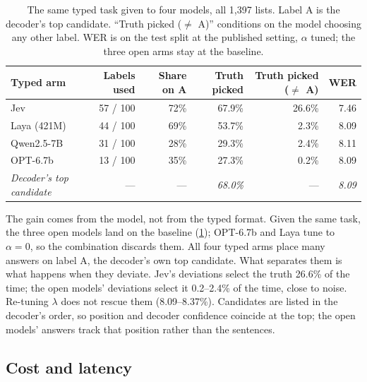 \documentclass[11pt]{article}
\begin{document}
\begin{table}[t]
\centering\small
\begin{tabular}{lrrrrr}
\toprule
Typed arm & Labels used & Share on A & Truth picked & Truth picked ($\neq$ A) & WER \\
\midrule
Jev & 57 / 100 & 72\% & 67.9\% & 26.6\% & 7.46 \\
Laya (421M) & 44 / 100 & 69\% & 53.7\% & 2.3\% & 8.09 \\
Qwen2.5-7B & 31 / 100 & 28\% & 29.3\% & 2.4\% & 8.11 \\
OPT-6.7b & 13 / 100 & 35\% & 27.3\% & 0.2\% & 8.09 \\
\midrule
\emph{Decoder's top candidate} & --- & --- & \emph{68.0\%} & --- & \emph{8.09} \\
\bottomrule
\end{tabular}
\caption{The same typed task given to four models, all 1,397 lists. Label A is the
decoder's top candidate. ``Truth picked ($\neq$ A)'' conditions on the model choosing any
other label. WER is on the test split at the published setting, $\alpha$ tuned; the
three open arms stay at the baseline.}
\label{tab:collapse}
\end{table}

The gain comes from the model, not from the typed format. Given the same task, the
three open models land on the baseline (\cref{tab:collapse}); OPT-6.7b and Laya tune to
$\alpha = 0$, so the combination discards them. All four typed arms place many answers on
label A, the decoder's own top candidate. What separates them is what happens when they
deviate. Jev's deviations select the truth 26.6\% of the time; the open models' deviations
select it 0.2--2.4\% of the time, close to noise. Re-tuning $\lambda$ does not rescue
them (8.09--8.37\%). Candidates are listed in the decoder's order, so position and
decoder confidence coincide at the top; the open models' answers track that position
rather than the sentences.

\subsection{Cost and latency}
\label{sec:cost}
\end{document}
